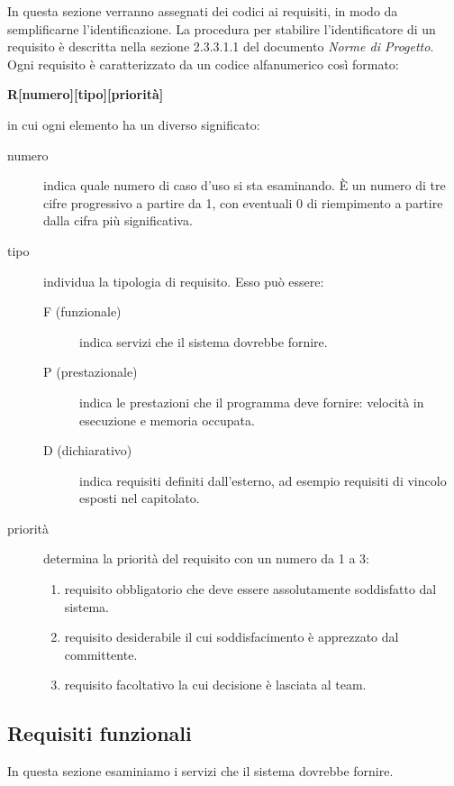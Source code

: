 \documentclass[../analisi-dei-requisiti.tex]{subfiles}
\begin{document}
In questa sezione verranno assegnati dei codici ai requisiti, in modo da semplificarne l’identificazione.
La procedura per stabilire l'identificatore di un requisito è descritta nella sezione 2.3.3.1.1 del documento \textit{Norme di Progetto}.
Ogni requisito è caratterizzato da un codice alfanumerico così formato:
\begin{center}
  \textbf{R[numero][tipo][priorità]}
\end{center}
in cui ogni elemento ha un diverso significato:
\begin{description}
  \item [numero] indica quale numero di caso d’uso si sta esaminando. È un numero di tre cifre progressivo a partire da 1, con eventuali 0 di riempimento a partire dalla cifra più significativa.
  \item [tipo] individua la tipologia di requisito. Esso può essere:
        \begin{description}
          \item [F (funzionale)] indica servizi che il sistema dovrebbe fornire.
          \item [P (prestazionale)] indica le prestazioni che il programma deve fornire: velocità in esecuzione e memoria occupata.
          \item [D (dichiarativo)] indica requisiti definiti dall'esterno, ad esempio requisiti di vincolo esposti nel capitolato.
        \end{description}
  \item [priorità] determina la priorità del requisito con un numero da 1 a 3:
        \begin{enumerate}
          \item requisito obbligatorio che deve essere assolutamente soddisfatto dal sistema.
          \item requisito desiderabile il cui soddisfacimento è apprezzato dal committente.
          \item requisito facoltativo la cui decisione è lasciata al team.
        \end{enumerate}
\end{description}

\subsection{Requisiti funzionali}%
\label{sub:requisiti_funzionali}
In questa sezione esaminiamo i servizi che il sistema dovrebbe fornire.
\end{document}
